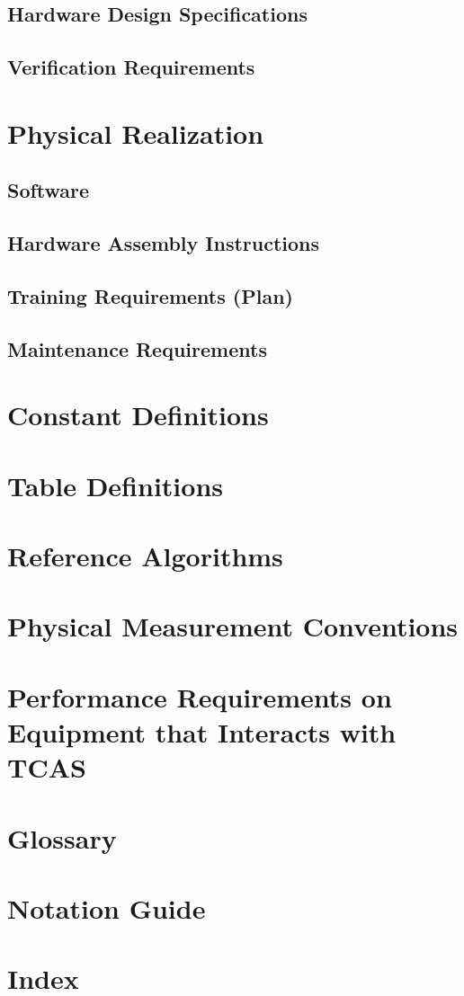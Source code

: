 \documentclass[12pt]{report}
\begin{document}
\section{Hardware Design Specifications}
\section{Verification Requirements}

\chapter{Physical Realization}
\section{Software}
\section{Hardware Assembly Instructions}
\section{Training Requirements (Plan)}
\section{Maintenance Requirements}

\appendix

\chapter{Constant Definitions}

\chapter{Table Definitions}

\chapter{Reference Algorithms}

\chapter{Physical Measurement Conventions}

\chapter{Performance Requirements on Equipment that Interacts with TCAS}

\chapter{Glossary}

\chapter{Notation Guide}

\chapter{Index}
\end{document}
